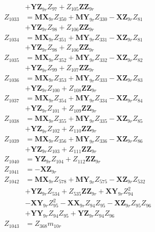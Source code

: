 \begin{multicols}{2}
\begin{align}
&+ \mathbf{YZ}_{9r}Z_{97} + Z_{105}\mathbf{ZZ}_{9r} \nonumber \\
Z_{1033} &= \mathbf{MX}_{9r}Z_{350} + \mathbf{MY}_{9r}Z_{330} - \mathbf{XZ}_{9r}Z_{81}  \nonumber \\
&+ \mathbf{YZ}_{9r}Z_{98} + Z_{106}\mathbf{ZZ}_{9r} \nonumber \\
Z_{1034} &= \mathbf{MX}_{9r}Z_{351} + \mathbf{MY}_{9r}Z_{331} - \mathbf{XZ}_{9r}Z_{81}  \nonumber \\
&+ \mathbf{YZ}_{9r}Z_{98} + Z_{106}\mathbf{ZZ}_{9r} \nonumber \\
Z_{1035} &= \mathbf{MX}_{9r}Z_{352} + \mathbf{MY}_{9r}Z_{332} - \mathbf{XZ}_{9r}Z_{82}  \nonumber \\
&+ \mathbf{YZ}_{9r}Z_{99} + Z_{107}\mathbf{ZZ}_{9r} \nonumber \\
Z_{1036} &= \mathbf{MX}_{9r}Z_{353} + \mathbf{MY}_{9r}Z_{333} - \mathbf{XZ}_{9r}Z_{83}  \nonumber \\
&+ \mathbf{YZ}_{9r}Z_{100} + Z_{108}\mathbf{ZZ}_{9r} \nonumber \\
Z_{1037} &= \mathbf{MX}_{9r}Z_{354} + \mathbf{MY}_{9r}Z_{334} - \mathbf{XZ}_{9r}Z_{84}  \nonumber \\
&+ \mathbf{YZ}_{9r}Z_{101} + Z_{109}\mathbf{ZZ}_{9r} \nonumber \\
Z_{1038} &= \mathbf{MX}_{9r}Z_{355} + \mathbf{MY}_{9r}Z_{335} - \mathbf{XZ}_{9r}Z_{85}  \nonumber \\
&+ \mathbf{YZ}_{9r}Z_{102} + Z_{110}\mathbf{ZZ}_{9r} \nonumber \\
Z_{1039} &= \mathbf{MX}_{9r}Z_{356} + \mathbf{MY}_{9r}Z_{336} - \mathbf{XZ}_{9r}Z_{86}  \nonumber \\
&+ \mathbf{YZ}_{9r}Z_{103} + Z_{111}\mathbf{ZZ}_{9r} \nonumber \\
Z_{1040} &= \mathbf{YZ}_{9r}Z_{104} + Z_{112}\mathbf{ZZ}_{9r} \nonumber \\
Z_{1041} &= -\mathbf{XZ}_{9r} \nonumber \\
Z_{1042} &= \mathbf{MX}_{9r}Z_{578} + \mathbf{MY}_{9r}Z_{575} - \mathbf{XZ}_{9r}Z_{532}  \nonumber \\
&+ \mathbf{YZ}_{9r}Z_{534} + Z_{535}\mathbf{ZZ}_{9r} + \mathbf{XY}_{9r}Z_{94}^2  \nonumber \\
&- \mathbf{XY}_{9r}Z_{95}^2 - \mathbf{XX}_{9r}Z_{94}Z_{95} - \mathbf{XZ}_{9r}Z_{95}Z_{96}  \nonumber \\
&+ \mathbf{YY}_{9r}Z_{94}Z_{95} + \mathbf{YZ}_{9r}Z_{94}Z_{96} \nonumber \\
Z_{1043} &= Z_{368}m_{10r} \nonumber \\

\end{align}
\end{multicols}
